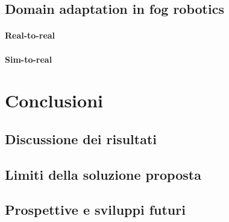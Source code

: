 \documentclass[12pt]{report}
\begin{document}
\section{Domain adaptation in fog robotics}
\label{sec:domain_shift_in_contesto_fog_robotics}

\subsubsection{Real-to-real}
\label{sec:real_to_real_fr}

\subsubsection{Sim-to-real}
\label{sec:sim_to_real_fr}

\chapter{Conclusioni}
\label{chap:conclusioni}

\section{Discussione dei risultati}
\label{sec:discussione_risultati}

\section{Limiti della soluzione proposta}
\label{sec:limiti}

\section{Prospettive e sviluppi futuri}
\label{sec:prospettive}

\beforebibliography



\closingpage
\end{document}

